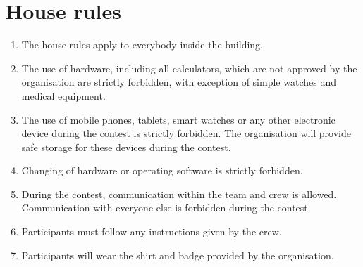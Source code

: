 \documentclass[11pt]{report}
\begin{document}
\section{House rules}
\begin{enumerate}[label=\bfseries 4.5.\arabic*]
\item \label{houserules} The house rules apply to everybody inside the building.
\item \label{hardware} The use of hardware, including all calculators, which are not approved by the organisation are strictly forbidden, with exception of simple watches and medical equipment.
\item \label{mobile} The use of mobile phones, tablets, smart watches or any other electronic device during the contest is strictly forbidden. The organisation will provide safe storage for these devices during the contest.
\item \label{changingHardware} Changing of hardware or operating software is strictly forbidden.
\item \label{communication} During the contest, communication within the team and crew is allowed. Communication with everyone else is forbidden during the contest.
\item \label{crewOrders} Participants must follow any instructions given by the crew.
\item \label{wearTShirt} Participants will wear the shirt and badge provided by the organisation. %
\end{enumerate}
\end{document}
